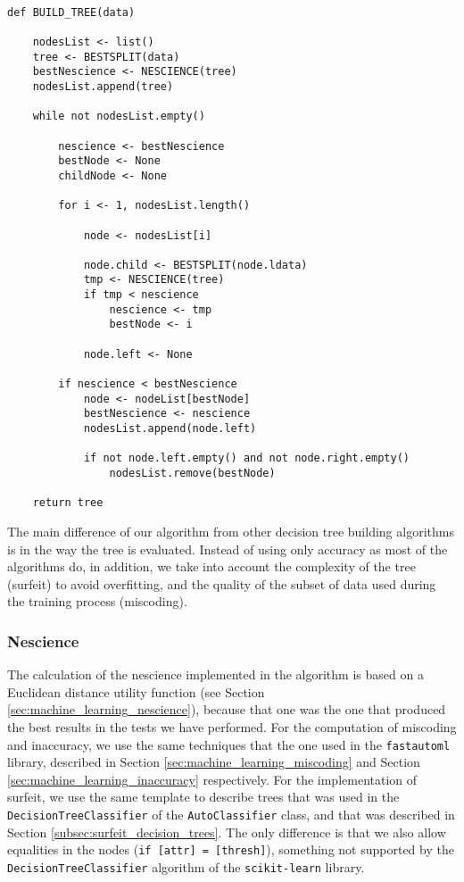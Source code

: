 \begin{sourcecode}
\label{algorithm:decision_tree}
{\scriptsize \begin{verbatim}

def BUILD_TREE(data)

    nodesList <- list()
    tree <- BESTSPLIT(data)
    bestNescience <- NESCIENCE(tree)
    nodesList.append(tree)

    while not nodesList.empty()
    
        nescience <- bestNescience
        bestNode <- None
        childNode <- None
        
        for i <- 1, nodesList.length()

            node <- nodesList[i]
            
            node.child <- BESTSPLIT(node.ldata)
            tmp <- NESCIENCE(tree)
            if tmp < nescience
                nescience <- tmp
                bestNode <- i
                
            node.left <- None

        if nescience < bestNescience
            node <- nodeList[bestNode]
            bestNescience <- nescience
            nodesList.append(node.left)
                        
            if not node.left.empty() and not node.right.empty()
                nodesList.remove(bestNode)
    
    return tree
\end{verbatim}}
\end{sourcecode}

The main difference of our algorithm from other decision tree building algorithms is in the way the tree is evaluated. Instead of using only accuracy as most of the algorithms do, in addition, we take into account the complexity of the tree (surfeit) to avoid overfitting, and the quality of the subset of data used during the training process (miscoding).

\subsubsection*{Nescience}
\label{sub:tree_nescience}

The calculation of the nescience implemented in the algorithm is based on a Euclidean distance utility function (see Section \ref{sec:machine_learning_nescience}), because that one was the one that produced the best results in the tests we have performed. For the computation of miscoding and inaccuracy, we use the same techniques that the one used in the \texttt{fastautoml} library, described in Section \ref{sec:machine_learning_miscoding} and Section \ref{sec:machine_learning_inaccuracy} respectively. For the implementation of surfeit, we use the same template to describe trees that was used in the \texttt{DecisionTreeClassifier} of the \texttt{AutoClassifier} class, and that was described in Section \ref{subsec:surfeit_decision_trees}. The only difference is that we also allow equalities in the nodes (\texttt{if [attr] = [thresh]}), something not supported by the \texttt{DecisionTreeClassifier} algorithm of the \texttt{scikit-learn} library.

